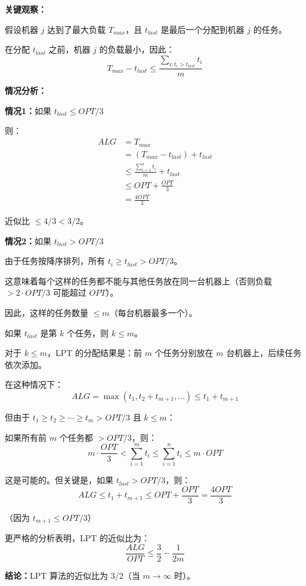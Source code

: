\documentclass[UTF8,12pt,a4paper]{ctexart}
\begin{document}
\textbf{关键观察：}

假设机器 $j$ 达到了最大负载 $T_{max}$，且 $t_{last}$ 是最后一个分配到机器 $j$ 的任务。

在分配 $t_{last}$ 之前，机器 $j$ 的负载最小，因此：
$$T_{max} - t_{last} \leq \frac{\sum_{i: t_i > t_{last}} t_i}{m}$$

\textbf{情况分析：}

\textbf{情况1：}如果 $t_{last} \leq OPT/3$

则：
\begin{align*}
ALG &= T_{max} \\
&= (T_{max} - t_{last}) + t_{last} \\
&\leq \frac{\sum_{i=1}^{n} t_i}{m} + t_{last} \\
&\leq OPT + \frac{OPT}{3} \\
&= \frac{4OPT}{3}
\end{align*}

近似比 $\leq 4/3 < 3/2$。

\textbf{情况2：}如果 $t_{last} > OPT/3$

由于任务按降序排列，所有 $t_i \geq t_{last} > OPT/3$。

这意味着每个这样的任务都不能与其他任务放在同一台机器上（否则负载 $> 2 \cdot OPT/3$ 可能超过 $OPT$）。

因此，这样的任务数量 $\leq m$（每台机器最多一个）。

如果 $t_{last}$ 是第 $k$ 个任务，则 $k \leq m$。

对于 $k \leq m$，LPT 的分配结果是：前 $m$ 个任务分别放在 $m$ 台机器上，后续任务依次添加。

在这种情况下：
$$ALG = \max(t_1, t_2 + t_{m+1}, \ldots) \leq t_1 + t_{m+1}$$

但由于 $t_1 \geq t_2 \geq \cdots \geq t_m > OPT/3$ 且 $k \leq m$：

如果所有前 $m$ 个任务都 $> OPT/3$，则：
$$m \cdot \frac{OPT}{3} < \sum_{i=1}^{m} t_i \leq \sum_{i=1}^{n} t_i \leq m \cdot OPT$$

这是可能的。但关键是，如果 $t_{last} > OPT/3$，则：
$$ALG \leq t_1 + t_{m+1} \leq OPT + \frac{OPT}{3} = \frac{4OPT}{3}$$

（因为 $t_{m+1} \leq OPT/3$）

更严格的分析表明，LPT 的近似比为：
$$\frac{ALG}{OPT} \leq \frac{3}{2} - \frac{1}{2m}$$

\textbf{结论：}LPT 算法的近似比为 $3/2$（当 $m \to \infty$ 时）。


\end{document}
